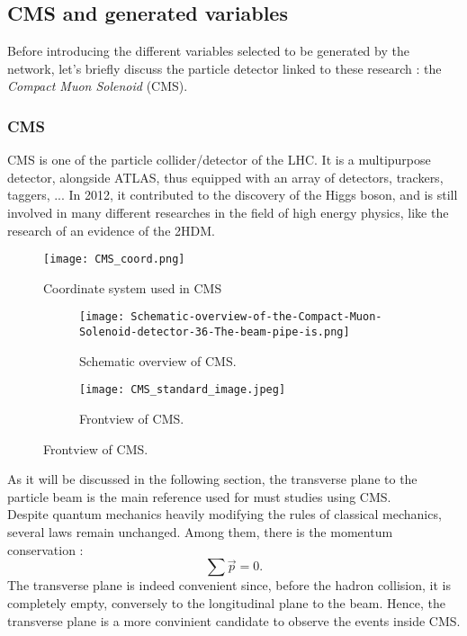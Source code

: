 \subsection{CMS and generated variables}

Before introducing the different variables selected to be generated by the network, let's briefly discuss the particle detector linked to these research : the \textit{Compact Muon Solenoid} (CMS).

\subsubsection*{CMS}%

CMS is one of the particle collider/detector of the LHC. It is a multipurpose detector, alongside ATLAS, thus equipped with an array of detectors, trackers, taggers, ... In 2012, it contributed to the discovery of the Higgs boson, and is still involved in many different researches in the field of high energy physics, like the research of an evidence of the 2HDM.

\begin{figure}[H]
    \centering
    \texttt{[image: CMS\_coord.png]}
    \caption{Coordinate system used in CMS}
    \label{fig:enter-label}
\end{figure}
\begin{figure}[H]
    \centering
    \begin{subfigure}{0.45\textwidth}
        \centering
        \texttt{[image: Schematic-overview-of-the-Compact-Muon-Solenoid-detector-36-The-beam-pipe-is.png]} %
        \caption{Schematic overview of CMS.}
        \label{fig:figure1}
    \end{subfigure}
    \hfill
    \begin{subfigure}{0.45\textwidth}
        \centering
        \texttt{[image: CMS\_standard\_image.jpeg]} %
        \caption{Frontview of CMS.}
        \label{fig:figure2}
    \end{subfigure}
    \label{fig:side_by_side}
\end{figure}
As it will be discussed in the following section, the transverse plane to the particle beam is the main reference used for must studies using CMS.\\ 
Despite quantum mechanics heavily modifying the rules of classical mechanics, several laws remain unchanged. Among them, there is the momentum conservation :
\begin{equation}
    \sum \Vec{p} = 0.
\end{equation}
The transverse plane is indeed convenient since, before the hadron collision, it is completely empty, conversely to the longitudinal plane to the beam. Hence, the transverse plane is a more convinient candidate to observe the events inside CMS.

